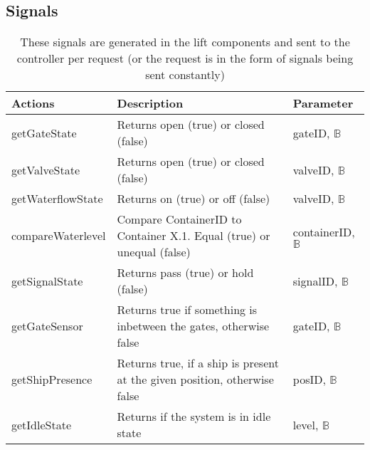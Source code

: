 		\subsection{Signals}
		\begin{table}[htbp]
			\centering
			\caption{These signals are generated in the lift components and sent to the controller per request (or the request is in the form of signals being sent constantly)}
			\begin{tabular}{lp{3in}l}
				\toprule
				\textbf{Actions} & \textbf{Description} & \textbf{Parameter} \\
				\hline
				getGateState & Returns open (true) or closed (false) & gateID, $ \mathbb{B} $ \\
				getValveState & Returns open (true) or closed (false) & valveID, $ \mathbb{B} $ \\
				getWaterflowState & Returns on (true) or off (false) & valveID, $ \mathbb{B} $ \\
				compareWaterlevel & Compare ContainerID to Container X.1. Equal (true) or unequal (false) & containerID, $ \mathbb{B} $ \\
				getSignalState & Returns pass (true) or hold (false) & signalID, $ \mathbb{B} $ \\
				getGateSensor &  Returns true if something is inbetween the gates, otherwise false & gateID, $ \mathbb{B} $ \\
				getShipPresence  & Returns true, if a ship is present at the given position, otherwise false & posID, $ \mathbb{B} $ \\
				getIdleState & Returns if the system is in idle state & level, $ \mathbb{B} $ \\
				\bottomrule
			\end{tabular}%
				\label{tab:addlabel}%
				\end{table}%
				
				
